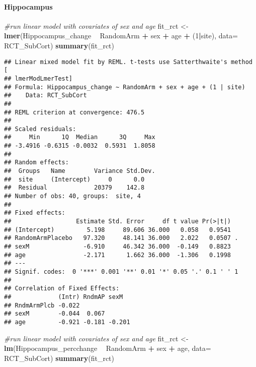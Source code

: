 \documentclass[]{article}
\newenvironment{Shaded}{\begin{snugshade}}{\end{snugshade}}
\newcommand{\KeywordTok}[1]{\textcolor[rgb]{0.13,0.29,0.53}{\textbf{#1}}}
\newcommand{\DataTypeTok}[1]{\textcolor[rgb]{0.13,0.29,0.53}{#1}}
\newcommand{\DecValTok}[1]{\textcolor[rgb]{0.00,0.00,0.81}{#1}}
\newcommand{\StringTok}[1]{\textcolor[rgb]{0.31,0.60,0.02}{#1}}
\newcommand{\CommentTok}[1]{\textcolor[rgb]{0.56,0.35,0.01}{\textit{#1}}}
\newcommand{\OperatorTok}[1]{\textcolor[rgb]{0.81,0.36,0.00}{\textbf{#1}}}
\newcommand{\NormalTok}[1]{#1}
\let\oldparagraph\paragraph
\renewcommand{\paragraph}[1]{\oldparagraph{#1}\mbox{}}
\theoremstyle{definition}
\theoremstyle{definition}
\theoremstyle{definition}
\theoremstyle{remark}
\begin{document}
\paragraph{Hippocampus}\label{hippocampus}

\begin{Shaded}
\begin{Highlighting}[]
\CommentTok{#run linear model with covariates of sex and age}
\NormalTok{  fit_rct <-}\StringTok{ }\KeywordTok{lmer}\NormalTok{(Hippocampus_change }\OperatorTok{~}\StringTok{ }\NormalTok{RandomArm }\OperatorTok{+}\StringTok{ }\NormalTok{sex }\OperatorTok{+}\StringTok{ }\NormalTok{age }\OperatorTok{+}\StringTok{ }\NormalTok{(}\DecValTok{1}\OperatorTok{|}\NormalTok{site), }\DataTypeTok{data=}\NormalTok{ RCT_SubCort)}
  \KeywordTok{summary}\NormalTok{(fit_rct)}
\end{Highlighting}
\end{Shaded}

\begin{verbatim}
## Linear mixed model fit by REML. t-tests use Satterthwaite's method [
## lmerModLmerTest]
## Formula: Hippocampus_change ~ RandomArm + sex + age + (1 | site)
##    Data: RCT_SubCort
## 
## REML criterion at convergence: 476.5
## 
## Scaled residuals: 
##     Min      1Q  Median      3Q     Max 
## -3.4916 -0.6315 -0.0032  0.5931  1.8058 
## 
## Random effects:
##  Groups   Name        Variance Std.Dev.
##  site     (Intercept)     0      0.0   
##  Residual             20379    142.8   
## Number of obs: 40, groups:  site, 4
## 
## Fixed effects:
##                  Estimate Std. Error     df t value Pr(>|t|)  
## (Intercept)         5.198     89.606 36.000   0.058   0.9541  
## RandomArmPlacebo   97.320     48.141 36.000   2.022   0.0507 .
## sexM               -6.910     46.342 36.000  -0.149   0.8823  
## age                -2.171      1.662 36.000  -1.306   0.1998  
## ---
## Signif. codes:  0 '***' 0.001 '**' 0.01 '*' 0.05 '.' 0.1 ' ' 1
## 
## Correlation of Fixed Effects:
##             (Intr) RndmAP sexM  
## RndmArmPlcb -0.022              
## sexM        -0.044  0.067       
## age         -0.921 -0.181 -0.201
\end{verbatim}

\begin{Shaded}
\begin{Highlighting}[]
\CommentTok{#run linear model with covariates of sex and age}
\NormalTok{  fit_rct <-}\StringTok{ }\KeywordTok{lm}\NormalTok{(Hippocampus_percchange }\OperatorTok{~}\StringTok{ }\NormalTok{RandomArm }\OperatorTok{+}\StringTok{ }\NormalTok{sex }\OperatorTok{+}\StringTok{ }\NormalTok{age, }\DataTypeTok{data=}\NormalTok{ RCT_SubCort)}
  \KeywordTok{summary}\NormalTok{(fit_rct)}
\end{Highlighting}
\end{Shaded}
\end{document}

